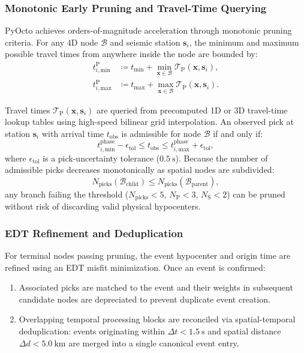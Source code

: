 \subsubsection{Monotonic Early Pruning and Travel-Time Querying}
\ac{PyOcto} achieves orders-of-magnitude acceleration through monotonic
pruning criteria. For any 4D node $\mathcal{B}$ and seismic station
$\mathbf{s}_i$, the minimum and maximum possible travel times from
anywhere inside the node are bounded by:
\begin{align}
  t_{i, \mathrm{min}}^{\mathrm{P}} & \coloneqq t_{\mathrm{min}} +
  \min_{\mathbf{x} \in \mathcal{B}}
  \mathcal{T}_{\mathrm{P}}(\mathbf{x}, \mathbf{s}_i),
  \label{eq:pyocto_traveltime} \\
  t_{i, \mathrm{max}}^{\mathrm{P}} & \coloneqq t_{\mathrm{max}} +
  \max_{\mathbf{x} \in \mathcal{B}}
  \mathcal{T}_{\mathrm{P}}(\mathbf{x}, \mathbf{s}_i).
\end{align}

Travel times $\mathcal{T}_{\mathrm{P}}(\mathbf{x}, \mathbf{s}_i)$
are queried from precomputed 1D or 3D travel-time lookup tables
using high-speed bilinear grid interpolation. An observed pick at
station $\mathbf{s}_i$ with arrival time $t_{\mathrm{obs}}$ is
admissible for node $\mathcal{B}$ if and only if:
\begin{equation}
  t_{i, \mathrm{min}}^{\mathrm{phase}} - \epsilon_{\mathrm{tol}} \le
  t_{\mathrm{obs}} \le t_{i, \mathrm{max}}^{\mathrm{phase}} +
  \epsilon_{\mathrm{tol}},
\end{equation}
where $\epsilon_{\mathrm{tol}}$ is a pick-uncertainty tolerance
($\qty{0.5}{\second}$). Because the number of admissible picks
decreases monotonically as spatial nodes are subdivided:
\begin{equation}
  N_{\mathrm{picks}}(\mathcal{B}_{\mathrm{child}}) \le
  N_{\mathrm{picks}}(\mathcal{B}_{\mathrm{parent}}),
\end{equation}
any branch failing the threshold ($N_{\mathrm{picks}} < \num{5}$,
$N_{\mathrm{P}} < \num{3}$, $N_{\mathrm{S}} < \num{2}$) can be pruned without
risk of discarding valid physical hypocenters.

\subsubsection{\acs{EDT} Refinement and Deduplication}
For terminal nodes passing pruning, the event hypocenter and origin
time are refined using an \ac{EDT} misfit minimization. Once an
event is confirmed:
\begin{enumerate}
  \item Associated picks are matched to the event and their weights
    in subsequent candidate nodes are depreciated to prevent
    duplicate event creation.
  \item Overlapping temporal processing blocks are reconciled via
    spatial-temporal deduplication: events originating within
    $\Delta t < \qty{1.5}{\second}$ and spatial distance $\Delta d <
    \qty{5.0}{\kilo\meter}$ are merged into a single canonical event entry.
\end{enumerate}

